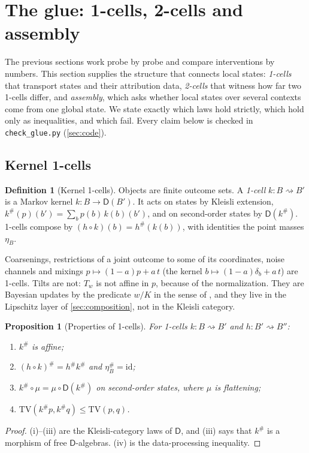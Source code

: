 \documentclass[11pt]{article}
\newtheorem{proposition}[theorem]{Proposition}
\theoremstyle{definition}
\newtheorem{definition}[theorem]{Definition}
\theoremstyle{remark}
\newcommand{\D}{\mathsf{D}}
\newcommand{\TV}{\mathrm{TV}}
\begin{document}
\section{The glue: 1-cells, 2-cells and assembly}\label{sec:glue}

The previous sections work probe by probe and compare interventions by numbers. This section
supplies the structure that connects local states: \emph{1-cells} that transport states and their
attribution data, \emph{2-cells} that witness how far two 1-cells differ, and \emph{assembly}, which
asks whether local states over several contexts come from one global state. We state exactly which
laws hold strictly, which hold only as inequalities, and which fail. Every claim below is checked in
\texttt{check\_glue.py} (\cref{sec:code}).

\subsection{Kernel 1-cells}\label{sec:onecells}

\begin{definition}[Kernel 1-cells]\label{def:onecell}
Objects are finite outcome sets. A \emph{1-cell} $k\colon B\rightsquigarrow B'$ is a Markov kernel
$k\colon B\to\D(B')$. It acts on states by Kleisli extension,
$k^\#(p)(b')=\sum_bp(b)\,k(b)(b')$, and on second-order states by $\D(k^\#)$. 1-cells compose by
$(h\circ k)(b)=h^\#(k(b))$, with identities the point masses $\eta_B$.
\end{definition}

Coarsenings, restrictions of a joint outcome to some of its coordinates, noise channels and
mixings $p\mapsto(1-a)p+a\,t$ (the kernel $b\mapsto(1-a)\delta_b+a\,t$) are 1-cells. Tilts are not:
$T_w$ is not affine in $p$, because of the normalization. They are Bayesian updates by the predicate
$w/K$ in the sense of \cite{JacobsZanasi2016}, and they live in the Lipschitz layer of
\cref{sec:composition}, not in the Kleisli category.

\begin{proposition}[Properties of 1-cells]\label{prop:onecell}
For 1-cells $k\colon B\rightsquigarrow B'$ and $h\colon B'\rightsquigarrow B''$:
\begin{enumerate}[label=(\roman*)]
\item $k^\#$ is affine;
\item $(h\circ k)^\#=h^\#k^\#$ and $\eta_B^\#=\mathrm{id}$;
\item $k^\#\circ\mu=\mu\circ\D(k^\#)$ on second-order states, where $\mu$ is flattening;
\item $\TV(k^\#p,k^\#q)\le\TV(p,q)$.
\end{enumerate}
\end{proposition}
\begin{proof}
(i)--(iii) are the Kleisli-category laws of $\D$, and (iii) says that $k^\#$ is a morphism of
free $\D$-algebras. (iv) is the data-processing inequality.
\end{proof}
\end{document}
